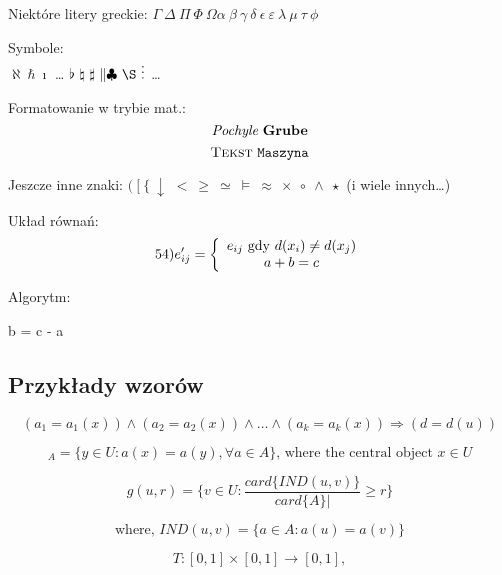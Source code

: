 ﻿\documentclass[a4paper,12pt]{article}
\begin{document}
Niektóre litery greckie: $ \Gamma \ \Delta \ \Pi \ \Phi \ \Omega \alpha \
 \beta \ \gamma \ \delta \ \epsilon \ \varepsilon \ \lambda \ \mu \ \tau \ 
\phi$


Symbole:\\
$ \aleph \ \hbar \ \imath $ \dots 
$ \flat \ \natural \ \sharp \ \| \clubsuit \ \S \ \vdots $ \dots 


Formatowanie w trybie mat.: \\
$$	\emph{Pochyle} \ \textbf{Grube}$$
$$ \textsc{Tekst} \ \verb"Maszyna"	$$

Jeszcze inne znaki:
$ ( \ [ \ \{ \ \downarrow $
$ < \ \geq \ \simeq \ \models \ \approx \ \times \ \circ \ \wedge \ \star$
(i wiele innych\dots)

Układ równań:
$$54) e'_{ij}= 
\left \{ 
			\begin{array}{c}
			e_{ij} \ {\rm gdy}\ d(x_i) \neq d(x_j) \\
			a + b = c\\
\end{array}
\right. $$

Algorytm:
\begin{algorithmic}
\item{b = c - a}
\EndIf
\end{algorithmic}

\subsection{Przykłady wzorów}

\begin{displaymath}
(a_1=a_1(x)) \wedge (a_2=a_2(x)) \wedge \dots \wedge
(a_k=a_k(x)) \Rightarrow (d=d(u))
\end{displaymath}

\begin{displaymath}
	[x]_A=\{y\in{}U:a(x)=a(y),\forall{}a\in{}A\}
	\textrm{, where the central
	object }x\in{}U
\end{displaymath}

\begin{displaymath}
	g(u,r)=\{v\in{}U:\frac{card\{IND(u,v)\}}
	{card\{A\}|}\geq{}r\}
\end{displaymath}

\begin{displaymath}
	\textrm{where, }IND(u,v)=\{a\in{}A:a(u)=a(v)\}
\end{displaymath}

\begin{displaymath}
	T:[0,1]\times[0,1]\rightarrow[0,1],
\end{displaymath}
\end{document}
